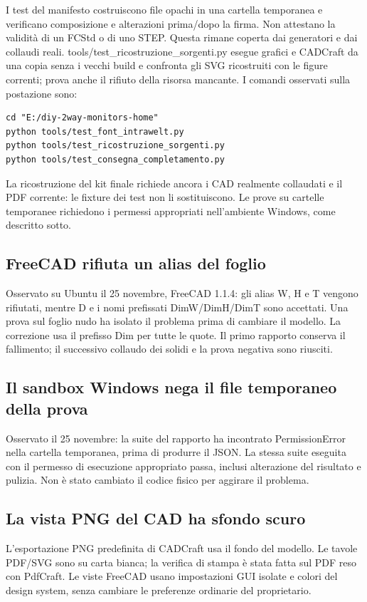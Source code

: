 \documentclass[
  italian,
  11pt,
  a4paper,
]{article}
\begin{document}
I test del manifesto costruiscono file opachi in una cartella temporanea e verificano
composizione e alterazioni prima/dopo la firma. Non attestano la validità di un FCStd o di
uno STEP. Questa rimane coperta dai generatori e dai collaudi reali.
tools/test\_ricostruzione\_sorgenti.py esegue grafici e CADCraft da una copia senza i vecchi
build e confronta gli SVG ricostruiti con le figure correnti; prova anche il rifiuto della
risorsa mancante. I comandi osservati sulla postazione sono:

\begin{lstlisting}
cd "E:/diy-2way-monitors-home"
python tools/test_font_intrawelt.py
python tools/test_ricostruzione_sorgenti.py
python tools/test_consegna_completamento.py
\end{lstlisting}

La ricostruzione del kit finale richiede ancora i CAD realmente collaudati e il PDF
corrente: le fixture dei test non li sostituiscono. Le prove su cartelle temporanee
richiedono i permessi appropriati nell'ambiente Windows, come descritto sotto.

\subsection{FreeCAD rifiuta un alias del foglio}\label{freecad-rifiuta-un-alias-del-foglio}

Osservato su Ubuntu il 25 novembre, FreeCAD 1.1.4: gli alias W, H e T vengono rifiutati,
mentre D e i nomi prefissati DimW/DimH/DimT sono accettati. Una prova sul foglio nudo ha
isolato il problema prima di cambiare il modello. La correzione usa il prefisso Dim per
tutte le quote. Il primo rapporto conserva il fallimento; il successivo collaudo dei solidi
e la prova negativa sono riusciti.

\subsection{Il sandbox Windows nega il file temporaneo della
prova}\label{il-sandbox-windows-nega-il-file-temporaneo-della-prova}

Osservato il 25 novembre: la suite del rapporto ha incontrato PermissionError nella cartella
temporanea, prima di produrre il JSON. La stessa suite eseguita con il permesso di
esecuzione appropriato passa, inclusi alterazione del risultato e pulizia. Non è stato
cambiato il codice fisico per aggirare il problema.

\subsection{La vista PNG del CAD ha sfondo
scuro}\label{la-vista-png-del-cad-ha-sfondo-scuro}

L'esportazione PNG predefinita di CADCraft usa il fondo del modello. Le tavole PDF/SVG sono
su carta bianca; la verifica di stampa è stata fatta sul PDF reso con PdfCraft. Le viste
FreeCAD usano impostazioni GUI isolate e colori del design system, senza cambiare le
preferenze ordinarie del proprietario.
\end{document}

